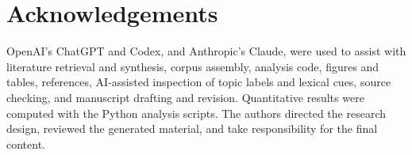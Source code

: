 \section*{Acknowledgements}
OpenAI's ChatGPT and Codex, and Anthropic's Claude, were used to assist with literature retrieval and synthesis, corpus assembly, analysis code, figures and tables, references, AI-assisted inspection of topic labels and lexical cues, source checking, and manuscript drafting and revision. Quantitative results were computed with the Python analysis scripts. The authors directed the research design, reviewed the generated material, and take responsibility for the final content.
